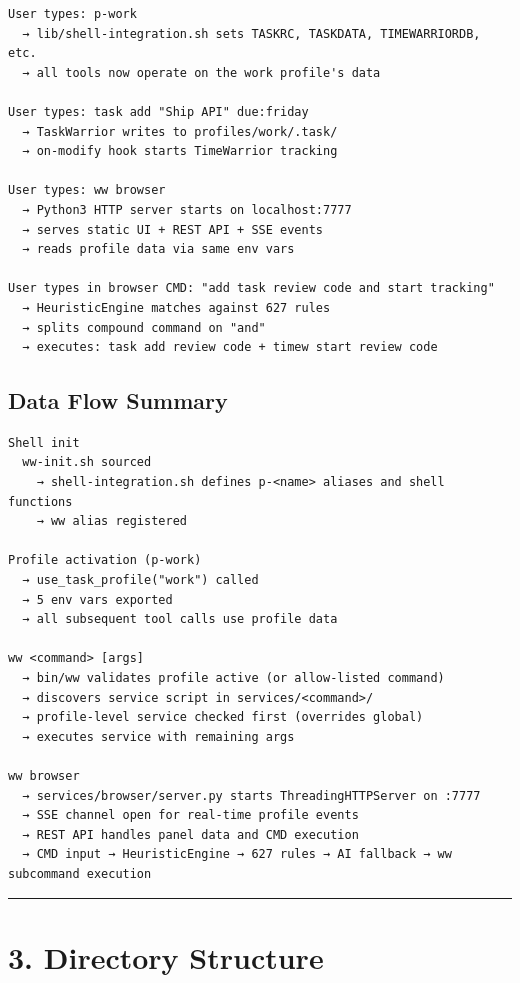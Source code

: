 \documentclass[
]{article}
\begin{document}
\begin{verbatim}
User types: p-work
  → lib/shell-integration.sh sets TASKRC, TASKDATA, TIMEWARRIORDB, etc.
  → all tools now operate on the work profile's data

User types: task add "Ship API" due:friday
  → TaskWarrior writes to profiles/work/.task/
  → on-modify hook starts TimeWarrior tracking

User types: ww browser
  → Python3 HTTP server starts on localhost:7777
  → serves static UI + REST API + SSE events
  → reads profile data via same env vars

User types in browser CMD: "add task review code and start tracking"
  → HeuristicEngine matches against 627 rules
  → splits compound command on "and"
  → executes: task add review code + timew start review code
\end{verbatim}

\subsection{Data Flow Summary}\label{data-flow-summary}

\begin{verbatim}
Shell init
  ww-init.sh sourced
    → shell-integration.sh defines p-<name> aliases and shell functions
    → ww alias registered

Profile activation (p-work)
  → use_task_profile("work") called
  → 5 env vars exported
  → all subsequent tool calls use profile data

ww <command> [args]
  → bin/ww validates profile active (or allow-listed command)
  → discovers service script in services/<command>/
  → profile-level service checked first (overrides global)
  → executes service with remaining args

ww browser
  → services/browser/server.py starts ThreadingHTTPServer on :7777
  → SSE channel open for real-time profile events
  → REST API handles panel data and CMD execution
  → CMD input → HeuristicEngine → 627 rules → AI fallback → ww subcommand execution
\end{verbatim}

\begin{center}\rule{0.5\linewidth}{0.5pt}\end{center}

\section{3. Directory Structure}\label{directory-structure}
\end{document}
